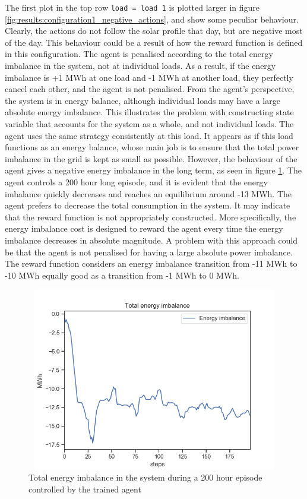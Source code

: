 \documentclass[class=book, crop=false]{standalone}
\begin{document}
 The first plot in the top row \texttt{load = load 1} is plotted larger in figure \ref{fig:results:configuration1_negative_actions}, and show some peculiar behaviour. Clearly, the actions do not follow the solar profile that day, but are negative most of the day. This behaviour could be a result of how the reward function is defined in this configuration. The agent is penalised according to the total energy imbalance in the system, not at individual loads. As a result, if the energy imbalance is +1 MWh at one load and -1 MWh at another load, they perfectly cancel each other, and the agent is not penalised. From the agent's perspective, the system is in energy balance, although individual loads may have a large absolute energy imbalance. This illustrates the problem with constructing state variable that accounts for the system as a whole, and not individual loads. The agent uses the same strategy consistently at this load. It appears as if this load functions as an energy balance, whose main job is to ensure that the total power imbalance in the grid is kept as small as possible. However, the behaviour of the agent gives a negative energy imbalance in the long term, as seen in figure \ref{fig:results:configuration1_energy_imbalance}. The agent controls a 200 hour long episode, and it is evident that the energy imbalance quickly decreases and reaches an equilibrium around -13 MWh. The agent prefers to decrease the total consumption in the system. It may indicate that the reward function is not appropriately constructed. More specifically, the energy imbalance cost is designed to reward the agent every time the energy imbalance decreases in absolute magnitude. A problem with this approach could be that the agent is not penalised for having a large absolute power imbalance. The reward function considers an energy imbalance transition from -11 MWh to -10 MWh equally good as a transition from -1 MWh to 0 MWh.
 
\begin{figure}[H]
    \center
\includegraphics[height=8cm, width=12cm]{figures/configuration1_imbalance.png}
    \caption[size = 9]{Total energy imbalance in the system during a 200 hour episode controlled by the trained agent}
    \label{fig:results:configuration1_energy_imbalance}
\end{figure}
\end{document}
